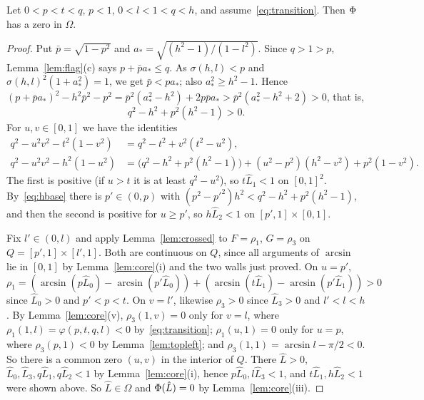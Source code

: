 \begin{proposition}\label{prop:ordered}
Let $0<p<t<q$, $p<1$, $0<l<1<q<h$, and assume~\eqref{eq:transition}. Then
$\Phi$ has a zero in $\Omega$.
\end{proposition}

\begin{proof}
Put $\bar p=\sqrt{1-p^2}$ and $a_*=\sqrt{(h^2-1)/(1-l^2)}$. Since $q>1>p$,
Lemma~\ref{lem:flag}(c) says $p+\bar pa_*\le q$. As $\sigma(h,l)<p$ and
$\sigma(h,l)^2(1+a_*^2)=1$, we get $\bar p<pa_*$; also $a_*^2\ge h^2-1$. Hence
$(p+\bar pa_*)^2-h^2\bar p^2-p^2=\bar p^2(a_*^2-h^2)+2p\bar pa_*
>\bar p^2(a_*^2-h^2+2)>0$, that is,
\begin{equation}\label{eq:hbase}
  q^2-h^2+p^2(h^2-1)>0 .
\end{equation}
For $u,v\in[0,1]$ we have the identities
\begin{align*}
  q^2-u^2v^2-t^2(1-v^2)&=q^2-t^2+v^2(t^2-u^2),\\
  q^2-u^2v^2-h^2(1-u^2)&=\bigl(q^2-h^2+p^2(h^2-1)\bigr)+(u^2-p^2)(h^2-v^2)+p^2(1-v^2).
\end{align*}
The first is positive (if $u>t$ it is at least $q^2-u^2$), so
$t\hat L_1<1$ on $[0,1]^2$. By~\eqref{eq:hbase} there is $p'\in(0,p)$ with
$(p^2-p'^2)h^2<q^2-h^2+p^2(h^2-1)$, and then the second is positive for
$u\ge p'$, so $h\hat L_2<1$ on $[p',1]\times[0,1]$.

Fix $l'\in(0,l)$ and apply Lemma~\ref{lem:crossed} to $F=\rho_1$, $G=\rho_3$
on $Q=[p',1]\times[l',1]$. Both are continuous on $Q$, since all arguments of
$\arcsin$ lie in $[0,1]$ by Lemma~\ref{lem:core}(i) and the two walls just
proved. On $u=p'$,
$\rho_1=(\arcsin(p\hat L_0)-\arcsin(p'\hat L_0))+(\arcsin(t\hat L_1)-\arcsin(p'\hat L_1))>0$
since $\hat L_0>0$ and $p'<p<t$. On $v=l'$, likewise $\rho_3>0$ since
$\hat L_3>0$ and $l'<l<h$. By Lemma~\ref{lem:core}(v), $\rho_3(1,v)=0$ only
for $v=l$, where $\rho_1(1,l)=\varphi(p,t,q,l)<0$ by~\eqref{eq:transition};
$\rho_1(u,1)=0$ only for $u=p$, where $\rho_3(p,1)<0$ by
Lemma~\ref{lem:topleft}; and $\rho_3(1,1)=\arcsin l-\pi/2<0$. So there is a
common zero $(u,v)$ in the interior of $Q$. There $\hat L>0$,
$\hat L_0,\hat L_3,q\hat L_1,q\hat L_2<1$ by Lemma~\ref{lem:core}(i), hence
$p\hat L_0,l\hat L_3<1$, and $t\hat L_1,h\hat L_2<1$ were shown above. So
$\hat L\in\Omega$ and $\Phi(\hat L)=0$ by Lemma~\ref{lem:core}(iii).
\end{proof}

